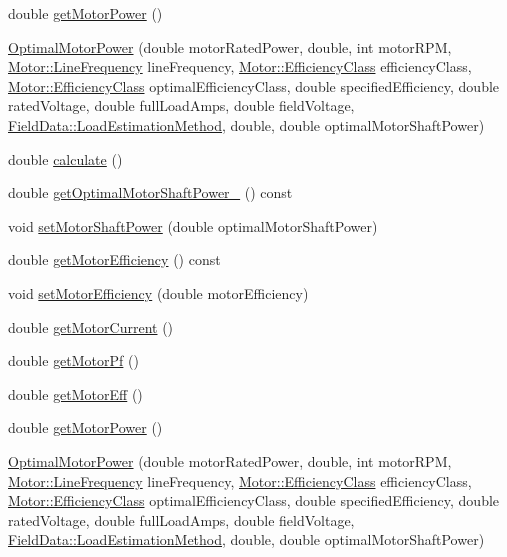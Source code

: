 \begin{DoxyCompactItemize}
double \hyperlink{class_optimal_motor_power_af35a32c24df9198bcf0df5b8f6ea03a9}{get\+Motor\+Power} ()
\item 
\hyperlink{class_optimal_motor_power_a655953d8e84d386a6e5ea4044098dcc0}{Optimal\+Motor\+Power} (double motor\+Rated\+Power, double, int motor\+R\+PM, \hyperlink{class_motor_acee1bdf1b684ad36cb80dc2829d9fcee}{Motor\+::\+Line\+Frequency} line\+Frequency, \hyperlink{class_motor_afa022971ae062406a9f588c601673d4e}{Motor\+::\+Efficiency\+Class} efficiency\+Class, \hyperlink{class_motor_afa022971ae062406a9f588c601673d4e}{Motor\+::\+Efficiency\+Class} optimal\+Efficiency\+Class, double specified\+Efficiency, double rated\+Voltage, double full\+Load\+Amps, double field\+Voltage, \hyperlink{class_field_data_a424e89914ba5684c01bb269dbe3312fd}{Field\+Data\+::\+Load\+Estimation\+Method}, double, double optimal\+Motor\+Shaft\+Power)
\item 
double \hyperlink{class_optimal_motor_power_a8db12b796c148e0130b261ae138057bf}{calculate} ()
\item 
double \hyperlink{class_optimal_motor_power_af902365015880d5f11d865465672d7bb}{get\+Optimal\+Motor\+Shaft\+Power\+\_\+} () const
\item 
void \hyperlink{class_optimal_motor_power_ada8a9e3caac34c54470ad13ffe7edf53}{set\+Motor\+Shaft\+Power} (double optimal\+Motor\+Shaft\+Power)
\item 
double \hyperlink{class_optimal_motor_power_a10b3528bec621cab146608c6326526e3}{get\+Motor\+Efficiency} () const
\item 
void \hyperlink{class_optimal_motor_power_a297acce2fcd06a57108fb52058a61cac}{set\+Motor\+Efficiency} (double motor\+Efficiency)
\item 
double \hyperlink{class_optimal_motor_power_a2c058c4320a840018a420e10272cc4dd}{get\+Motor\+Current} ()
\item 
double \hyperlink{class_optimal_motor_power_a94d4c8a84c1bd19b799e35b966368f5a}{get\+Motor\+Pf} ()
\item 
double \hyperlink{class_optimal_motor_power_a341fe7520227f27f9cce23f3dc4cb0cb}{get\+Motor\+Eff} ()
\item 
double \hyperlink{class_optimal_motor_power_af35a32c24df9198bcf0df5b8f6ea03a9}{get\+Motor\+Power} ()
\item 
\hyperlink{class_optimal_motor_power_a655953d8e84d386a6e5ea4044098dcc0}{Optimal\+Motor\+Power} (double motor\+Rated\+Power, double, int motor\+R\+PM, \hyperlink{class_motor_acee1bdf1b684ad36cb80dc2829d9fcee}{Motor\+::\+Line\+Frequency} line\+Frequency, \hyperlink{class_motor_afa022971ae062406a9f588c601673d4e}{Motor\+::\+Efficiency\+Class} efficiency\+Class, \hyperlink{class_motor_afa022971ae062406a9f588c601673d4e}{Motor\+::\+Efficiency\+Class} optimal\+Efficiency\+Class, double specified\+Efficiency, double rated\+Voltage, double full\+Load\+Amps, double field\+Voltage, \hyperlink{class_field_data_a424e89914ba5684c01bb269dbe3312fd}{Field\+Data\+::\+Load\+Estimation\+Method}, double, double optimal\+Motor\+Shaft\+Power)

\end{DoxyCompactItemize}
